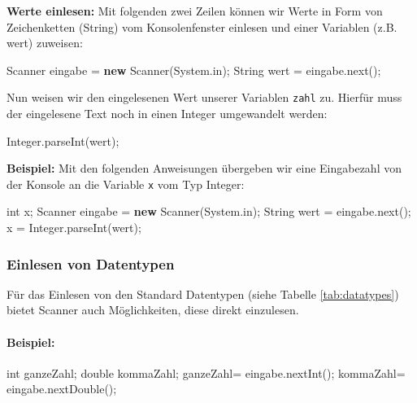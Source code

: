 \documentclass[12pt,a4paper, twoside=false]{scrartcl}
\newenvironment {Shaded}
        {\begin{mdframed}[style=code] }
         {\end{mdframed}}
\newcommand{\KeywordTok}[1]{\textcolor[rgb]{0.00,0.44,0.13}{\textbf{{#1}}}}
\newcommand{\DataTypeTok}[1]{\textcolor[rgb]{0.56,0.13,0.00}{{#1}}}
\newcommand{\FunctionTok}[1]{\textcolor[rgb]{0.02,0.16,0.49}{{#1}}}
\newcommand{\NormalTok}[1]{{#1}}
\begin{document}
\textbf{Werte einlesen:} Mit folgenden zwei Zeilen können wir Werte in
Form von Zeichenketten (String) vom Konsolenfenster einlesen und einer
Variablen (z.B. wert) zuweisen:

\begin{Shaded}
\begin{Highlighting}[]
\NormalTok{Scanner eingabe = }\KeywordTok{new} \NormalTok{Scanner(System.}\FunctionTok{in}\NormalTok{);}
\NormalTok{String wert = eingabe.}\FunctionTok{next}\NormalTok{();}
\end{Highlighting}
\end{Shaded}

Nun weisen wir den eingelesenen Wert unserer Variablen \texttt{zahl} zu.
Hierfür muss der eingelesene Text noch in einen Integer umgewandelt
werden:

\begin{Shaded}
\begin{Highlighting}[]
\NormalTok{Integer.}\FunctionTok{parseInt}\NormalTok{(wert);}
\end{Highlighting}
\end{Shaded}

\textbf{Beispiel:} Mit den folgenden Anweisungen übergeben wir eine
Eingabezahl von der Konsole an die Variable \texttt{x} vom Typ Integer:

\begin{Shaded}
\begin{Highlighting}[]
\DataTypeTok{int} \NormalTok{x;}
\NormalTok{Scanner eingabe = }\KeywordTok{new} \NormalTok{Scanner(System.}\FunctionTok{in}\NormalTok{);}
\NormalTok{String wert = eingabe.}\FunctionTok{next}\NormalTok{();}
\NormalTok{x = Integer.}\FunctionTok{parseInt}\NormalTok{(wert);}
\end{Highlighting}
\end{Shaded}

\subsubsection{Einlesen von Datentypen}\label{einlesen-von-datentypen}

Für das Einlesen von den Standard Datentypen (siehe Tabelle
\ref{tab:datatypes}) bietet Scanner auch Möglichkeiten, diese direkt
einzulesen.

\paragraph{Beispiel:}\label{beispiel-9}

\begin{Shaded}
\begin{Highlighting}[]
\DataTypeTok{int} \NormalTok{ganzeZahl;}
\DataTypeTok{double} \NormalTok{kommaZahl;}
\NormalTok{ganzeZahl= eingabe.}\FunctionTok{nextInt}\NormalTok{();}
\NormalTok{kommaZahl= eingabe.}\FunctionTok{nextDouble}\NormalTok{();}
\end{Highlighting}
\end{Shaded}
\end{document}
